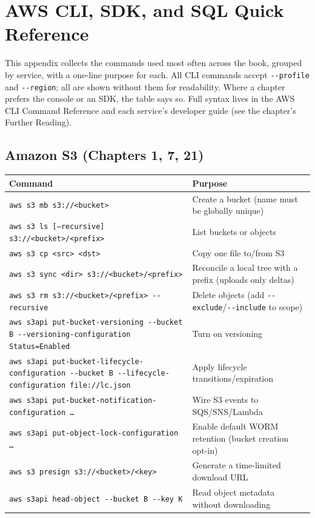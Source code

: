 \chapter{AWS CLI, SDK, and SQL Quick Reference}
%
This appendix collects the commands used most often across the book, grouped by service, with a
one-line purpose for each. All CLI commands accept \texttt{-{}-profile} and \texttt{-{}-region};
all are shown without them for readability. Where a chapter prefers the console or an SDK, the
table says so. Full syntax lives in the AWS CLI Command Reference \cite{awsCliV2UserGuide} and
each service's developer guide (see the chapter's Further Reading).

\section{Amazon S3 (Chapters 1, 7, 21)}
%

\begin{center}
\footnotesize
\begin{tabular}{@{}p{7.2cm}p{7.6cm}@{}}
\toprule
\textbf{Command} & \textbf{Purpose} \\
\midrule
\texttt{aws s3 mb s3://<bucket>} & Create a bucket (name must be globally unique) \\
\texttt{aws s3 ls [--recursive] s3://<bucket>/<prefix>} & List buckets or objects \\
\texttt{aws s3 cp <src> <dst>} & Copy one file to/from S3 \\
\texttt{aws s3 sync <dir> s3://<bucket>/<prefix>} & Reconcile a local tree with a prefix (uploads only deltas) \\
\texttt{aws s3 rm s3://<bucket>/<prefix> -{}-recursive} & Delete objects (add \texttt{-{}-exclude}/\texttt{-{}-include} to scope) \\
\texttt{aws s3api put-bucket-versioning -{}-bucket B -{}-versioning-configuration Status=Enabled} & Turn on versioning \\
\texttt{aws s3api put-bucket-lifecycle-configuration -{}-bucket B -{}-lifecycle-configuration file://lc.json} & Apply lifecycle transitions/expiration \\
\texttt{aws s3api put-bucket-notification-configuration \dots} & Wire S3 events to SQS/SNS/Lambda \\
\texttt{aws s3api put-object-lock-configuration \dots} & Enable default WORM retention (bucket creation opt-in) \\
\texttt{aws s3 presign s3://<bucket>/<key>} & Generate a time-limited download URL \\
\texttt{aws s3api head-object -{}-bucket B -{}-key K} & Read object metadata without downloading \\
\bottomrule
\end{tabular}
\end{center}

